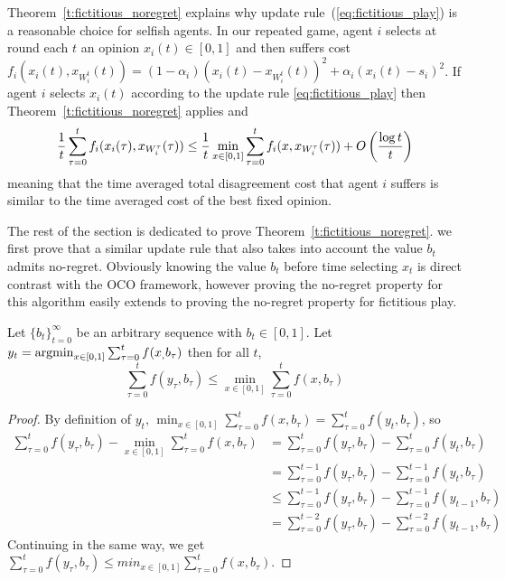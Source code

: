 Theorem~\ref{t:fictitious_noregret} explains why update rule~(\ref{eq:fictitious_play}) is a
reasonable choice for selfish agents. In our repeated game, agent $i$ selects at round each $t$ an opinion
$x_i(t)\in [0,1]$ and then suffers cost $f_i(x_i(t),x_{W_i^t}(t))=(1-\alpha_i)(x_i(t)-x_{W_i^t}(t))^2+\alpha_i(x_i(t)-s_i)^2$.
If agent $i$ selects $x_i(t)$ according  to the update rule \ref{eq:fictitious_play} then Theorem~\ref{t:fictitious_noregret}
applies and\[\frac{1}{t}\sum_{\tau=0}^t f_i(x_i(\tau),x_{W_i^\tau}(\tau)) \leq
\frac{1}{t}\min_{x \in [0,1]}\sum_{\tau=0}^tf_i(x,x_{W_i^\tau}(\tau)) + O\left(\frac{\log t}{t}\right)\]
meaning that the time averaged total disagreement cost that agent $i$ suffers is similar to the
time averaged cost of the best fixed opinion.

The rest of the section is dedicated to prove Theorem~\ref{t:fictitious_noregret}. we first prove that a similar update rule that also takes into
account the value $b_t$ admits no-regret. Obviously knowing the value $b_t$ before time selecting $x_t$ is direct contrast
with the OCO framework, however proving the no-regret property for this algorithm easily extends to proving the no-regret property
for fictitious play.

\begin{lemma}
Let $\{b_t\}_{t=0}^\infty$ be an arbitrary sequence with $b_t \in [0,1]$. Let $y_t = \operatorname*{argmin}_{x \in [0,1]}\sum_{\tau=0}^tf(x_,b_\tau)$
then for all $t$,
\[
\sum_{\tau=0}^t f(y_\tau,b_\tau) \leq \min_{x \in [0,1]}\sum_{\tau = 0}^tf(x,b_\tau)
\]
\end{lemma}

\begin{proof}By definition of $y_t$,
  $\min_{ x \in [0,1]} \sum_{\tau=0}^t f(x,b_\tau) = \sum_{\tau=0}^t f(y_t,b_\tau)$, so
  \begin{align*}
    \sum_{\tau=0}^t f(y_\tau,b_\tau) - \min_{ x \in [0,1]} \sum_{\tau=0}^t f(x,b_\tau) &=
    \sum_{\tau=0}^t f(y_\tau,b_\tau) - \sum_{\tau=0}^t f(y_t,b_\tau)\\
    &= \sum_{\tau=0}^{t-1} f(y_\tau,b_\tau) - \sum_{\tau=0}^{t-1} f(y_t,b_\tau)\\
    &\leq \sum_{\tau=0}^{t-1} f(y_\tau,b_\tau) - \sum_{\tau=0}^{t-1} f(y_{t-1},b_\tau)\\
    &= \sum_{\tau=0}^{t-2} f(y_\tau,b_\tau) - \sum_{\tau=0}^{t-2}f(y_{t-1},b_\tau)
  \end{align*}
  Continuing in the same way, we get
  $\sum_{\tau=0}^t f(y_\tau,b_\tau) \leq min_{ x \in [0,1]} \sum_{\tau=0}^t f(x,b_\tau)$.
\end{proof}

